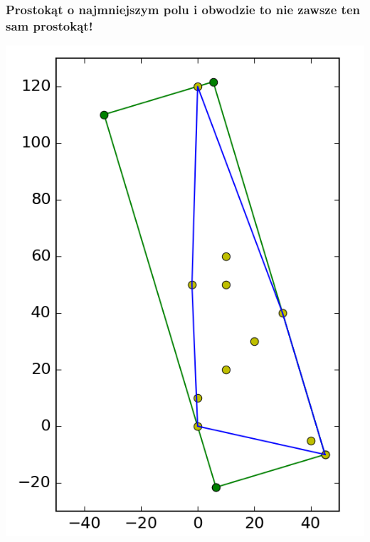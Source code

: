 \documentclass{beamer}
\begin{document}
\begin{frame}
\frametitle{Prostokąt o najmniejszym polu i obwodzie to nie zawsze ten sam prostokąt!}

\begin{center}
\includegraphics[height=0.65\paperheight]{pics/area.png}

\end{center}
\end{frame}
\end{document}

